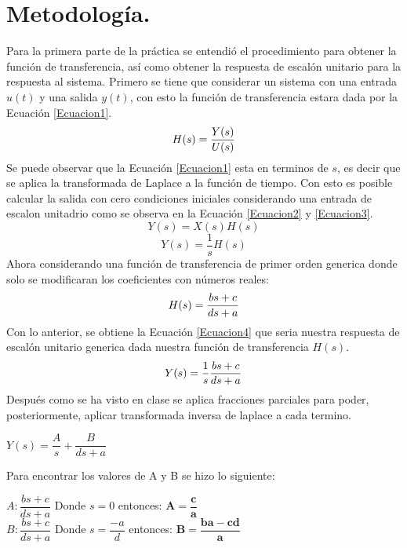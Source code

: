 \documentclass[12pt,a4paper]{article}
\begin{document}
\section{Metodología.}
Para la primera parte de la práctica se entendió el procedimiento para obtener la función de transferencia, así como obtener la respuesta de escalón unitario para la respuesta al sistema. Primero se tiene que considerar un sistema con una entrada $u(t)$ y una salida $y(t)$, con esto la función de transferencia estara dada por la Ecuación \ref{Ecuacion1}.
\begin{equation}
\centering
H(s) = \dfrac{Y(s)}{U(s)}
\label{Ecuacion1}
\end{equation}
Se puede observar que la Ecuación \ref{Ecuacion1} esta en terminos de $s$, es decir que se aplica la transformada de Laplace a la función de tiempo. Con esto es posible calcular la salida con cero condiciones iniciales considerando una entrada de escalon unitadrio como se observa en la Ecuación \ref{Ecuacion2} y \ref{Ecuacion3}.
\begin{equation}
Y(s) = X(s)H(s)
\label{Ecuacion2}
\end{equation}
\begin{equation}
Y(s) = \dfrac{1}{s}H(s)
\label{Ecuacion3}
\end{equation}
Ahora considerando una función de transferencia de primer orden generica donde solo se modificaran los coeficientes con números reales:
\begin{equation}
\centering
H(s) = \dfrac{bs + c}{ds + a}
\label{Ecuacion5}
\end{equation}
Con lo anterior, se obtiene la Ecuación \ref{Ecuacion4} que seria nuestra respuesta de escalón unitario generica dada nuestra función de transferencia $H(s)$.
\begin{equation}
\centering
Y(s) = \dfrac{1}{s}\dfrac{bs + c}{ds + a}
\label{Ecuacion4}
\end{equation}
Después como se ha visto en clase se aplica fracciones parciales para poder, posteriormente, aplicar transformada inversa de laplace a cada termino.
\begin{center}
$Y(s) = \dfrac{A}{s} + \dfrac{B}{ds + a}$
\end{center}
Para encontrar los valores de A y B se hizo lo siguiente:
\begin{center}
$A: \dfrac{bs+c}{ds + a}$ Donde $s = 0$ entonces: $\mathbf{A = \dfrac{c}{a}}$\\[12pt]
$B: \dfrac{bs+c}{ds + a}$ Donde $s = \dfrac{-a}{d}$ entonces: $\mathbf{B = \dfrac{ba-cd}{a}}$
\end{center}
\end{document}
